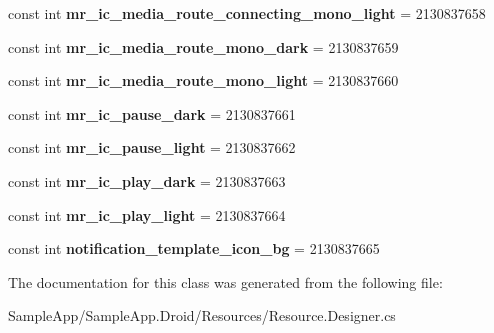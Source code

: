 \begin{DoxyCompactItemize}
const int {\bfseries mr\+\_\+ic\+\_\+media\+\_\+route\+\_\+connecting\+\_\+mono\+\_\+light} = 2130837658
\item 
\mbox{\label{class_sample_app_1_1_droid_1_1_resource_1_1_drawable_a1040873071b3b9cf9f70beef211b5c49}} 
const int {\bfseries mr\+\_\+ic\+\_\+media\+\_\+route\+\_\+mono\+\_\+dark} = 2130837659
\item 
\mbox{\label{class_sample_app_1_1_droid_1_1_resource_1_1_drawable_abca1578b6568793919d7a8cb3acc5aab}} 
const int {\bfseries mr\+\_\+ic\+\_\+media\+\_\+route\+\_\+mono\+\_\+light} = 2130837660
\item 
\mbox{\label{class_sample_app_1_1_droid_1_1_resource_1_1_drawable_aa7ad900f0a5e658e3b39d969dc6c31e0}} 
const int {\bfseries mr\+\_\+ic\+\_\+pause\+\_\+dark} = 2130837661
\item 
\mbox{\label{class_sample_app_1_1_droid_1_1_resource_1_1_drawable_a5508e55780763f9954a34867c855d65b}} 
const int {\bfseries mr\+\_\+ic\+\_\+pause\+\_\+light} = 2130837662
\item 
\mbox{\label{class_sample_app_1_1_droid_1_1_resource_1_1_drawable_ab54e346fc3087a859a7106772efd3214}} 
const int {\bfseries mr\+\_\+ic\+\_\+play\+\_\+dark} = 2130837663
\item 
\mbox{\label{class_sample_app_1_1_droid_1_1_resource_1_1_drawable_a4c81d3be53b5ec515bf1a0ff56ccb388}} 
const int {\bfseries mr\+\_\+ic\+\_\+play\+\_\+light} = 2130837664
\item 
\mbox{\label{class_sample_app_1_1_droid_1_1_resource_1_1_drawable_af103ff9767148b127e80ef8545ed4f15}} 
const int {\bfseries notification\+\_\+template\+\_\+icon\+\_\+bg} = 2130837665
\end{DoxyCompactItemize}


The documentation for this class was generated from the following file\+:\begin{DoxyCompactItemize}
\item 
Sample\+App/\+Sample\+App.\+Droid/\+Resources/Resource.\+Designer.\+cs\end{DoxyCompactItemize}
